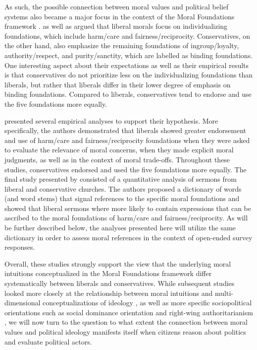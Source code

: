 \documentclass[12pt]{article}
\begin{document}
As such, the possible connection between moral values and political belief systems also became a major focus in the context of the Moral Foundations framework \citep[c.f.][]{haidt2012righteous}. \citet{haidt2007morality} as well as \citet{graham2009liberals} argued that liberal morals focus on individualizing foundations, which include harm/care and fairness/reciprocity. Conservatives, on the other hand, also emphasize the remaining foundations of ingroup/loyalty, authority/respect, and purity/sanctity, which are labelled as binding foundations. One interesting aspect about their expectations as well as their empirical results is that conservatives do not prioritize less on the individualizing foundations than liberals, but rather that liberals differ in their lower degree of emphasis on binding foundations. Compared to liberals, conservatives tend to endorse and use the five foundations more equally.

\citet{graham2009liberals} presented several empirical analyses to support their hypothesis. More specifically, the authors demonstrated that liberals showed greater endorsement and use of harm/care and fairness/reciprocity foundations when they were asked to evaluate the relevance of moral concerns, when they made explicit moral judgments, as well as in the context of moral trade-offs. Throughout these studies, conservatives endorsed and used the five foundations more equally. The final study presented by \citet{graham2009liberals} consisted of a quantitative analysis of sermons from liberal and conservative churches. The authors proposed a dictionary of words (and word stems) that signal references to the specific moral foundations and showed that liberal sermons where more likely to contain expressions that can be ascribed to the moral foundations of harm/care and fairness/reciprocity. As will be further described below, the analyses presented here will utilize the same dictionary in order to assess moral references in the context of open-ended survey responses.

Overall, these studies strongly support the view that the underlying moral intuitions conceptualized in the Moral Foundations framework differ systematically between liberals and conservatives. While subsequent studies looked more closely at the relationship between moral intuitions and multi-dimensional conceptualizations of ideology \citep[c.f.][]{haidt2009above}, as well as more specific sociopolitical orientations such as social dominance orientation and right-wing authoritarianism \citep[c.f.][]{federico2013mapping}, we will now turn to the question to what extent the connection between moral values and political ideology manifests itself when citizens reason about politics and evaluate political actors.
\end{document}
